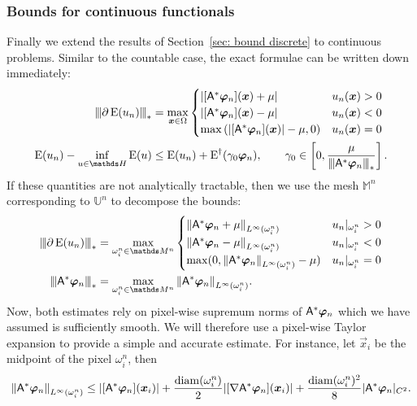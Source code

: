 \documentclass[smallextended]{svjour3}
\let\F\mathds\let\C\mathcal\newcommand{\R}{\F{R}}\newcommand{\A}{\tens{A}}
\newcommand{\norm}[1]{{\left\lVert #1 \right\rVert}}
\newcommand{\Norm}[1]{{\left\vert\kern-0.25ex\left\vert\kern-0.25ex\left\vert #1 \right\vert\kern-0.25ex\right\vert\kern-0.25ex\right\vert}}
\newcommand{\op}[1]{\operatorname{#1}}
\newcommand{\1}{\F{1}}
\newcommand{\Emin}[1][\var0]{\inf_{#1\in\F H}\op{E}(#1)}
\newcommand{\Domain}{\Omega}\newcommand{\domain}{\omega}
\newcommand*{\var}[1]{%
	\IfEqCase{#1}{%
		{0}{u}%
		{1}{v}%
		{2}{w}%
	}[u#1]%
}
\newcommand*{\vars}[1]{%
	\IfEqCase{#1}{%
		{0}{\alpha}%
		{1}{\beta}%
		{2}{\gamma}%
		{3}{a}%
		{4}{b}%
		{5}{c}%
	}[k#1]%
}
\begin{document}
	\subsubsection{Bounds for continuous functionals}\label{sec: bound continuous}
	Finally we extend the results of Section~\ref{sec: bound discrete} to continuous problems. Similar to the countable case, the exact formulae can be written down immediately:
	\begin{align}
		\Norm{\partial\op{E}(\var0_n)}_* &= \max_{\vec{x}\in\Domain}\begin{cases}
			|[\A^*\vec{\varphi}_n](\vec{x}) + \mu| & \var0_n(\vec{x})>0
			\\|[\A^*\vec{\varphi}_n](\vec{x}) - \mu| & \var0_n(\vec{x})<0
			\\\max\left(|[\A^*\vec{\varphi}_n](\vec{x})| - \mu, 0\right) & \var0_n(\vec{x}) = 0
		\end{cases}
		\\ \op{E}(\var0_n)-\Emin &\leq \op{E}(\var0_n) + \op{E}^\dag(\vars2_0\vec{\varphi}_n), \qquad \vars2_0\in\left[0,\frac{\mu}{\Norm{\A^*\vec{\varphi}_n}_*}\right].
	\end{align}
	If these quantities are not analytically tractable, then we use the mesh $\F M^n$ corresponding to $\F{U}^n$ to decompose the bounds:
	\begin{align}
		\Norm{\partial \op{E}(\var0_n)}_* &= \max_{\domain_i^n\in\F M^n} \begin{cases}
			\norm{\A^*\vec{\varphi}_n + \mu}_{L^\infty(\domain_i^n)} & \var0_n|_{\domain_i^n} > 0
			\\\norm{\A^*\vec{\varphi}_n - \mu}_{L^\infty(\domain_i^n)} & \var0_n|_{\domain_i^n} < 0
			\\\max(0, \norm{\A^*\vec{\varphi}_n}_{L^\infty(\domain_i^n)}-\mu) & \var0_n|_{\domain_i^n} = 0
		\end{cases}
		\\ \Norm{\A^*\vec{\varphi}_n}_* &= \max_{\domain_i^n\in\F M^n} \norm{\A^*\vec{\varphi}_n}_{L^\infty(\domain_i^n)}.
	\end{align}
	Now, both estimates rely on pixel-wise supremum norms of $\A^*\vec{\varphi}_n$ which we have assumed is sufficiently smooth. We will therefore use a pixel-wise Taylor expansion to provide a simple and accurate estimate. For instance, let $\vec{x}_i$ be the midpoint of the pixel $\domain_i^n$, then 
	\begin{equation}\label{eq: Taylor approximation}
		\norm{\A^*\vec{\varphi}_n}_{L^\infty(\domain_i^n)} \leq |[\A^*\vec{\varphi}_n](\vec{x}_i)| + \frac{\op{diam}(\domain_i^n)}{2}|[\nabla\A^*\vec{\varphi}_n](\vec{x}_i)| + \frac{\op{diam}(\domain_i^n)^2}{8}|\A^*\vec{\varphi}_n|_{C^2}.
	\end{equation}
\end{document}
